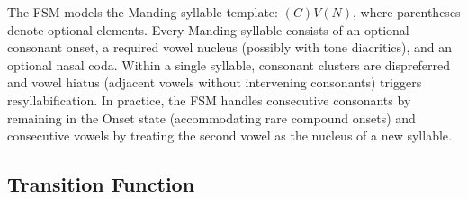\documentclass[11pt]{article}
\begin{document}
The FSM models the Manding syllable template: $(C)V(N)$, where parentheses denote optional elements.
Every Manding syllable consists of an optional consonant onset, a required vowel nucleus (possibly with tone diacritics), and an optional nasal coda.
Within a single syllable, consonant clusters are dispreferred and vowel hiatus (adjacent vowels without intervening consonants) triggers resyllabification.
In practice, the FSM handles consecutive consonants by remaining in the Onset state (accommodating rare compound onsets) and consecutive vowels by treating the second vowel as the nucleus of a new syllable.

\subsection{Transition Function}
\end{document}
